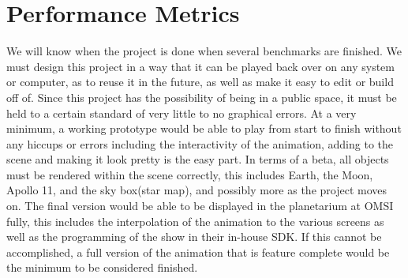 \documentclass[10pt,a4paper,oneside,onecolumn, english]{IEEEtran}
\begin{document}
\section{Performance Metrics}
We will know when the project is done when several benchmarks are finished. We must design this project in a way that it can be played back over on any system or computer, as to reuse it in the future, as well as make it easy to edit or build off of. Since this project has the possibility of being in a public space, it must be held to a certain standard of very little to no graphical errors. At a very minimum, a working prototype would be able to play from start to finish without any hiccups or errors including the interactivity of the animation, adding to the scene and making it look pretty is the easy part. In terms of a beta, all objects must be rendered within the scene correctly, this includes Earth, the Moon, Apollo 11, and the sky box(star map), and possibly more as the project moves on. The final version would be able to be displayed in the planetarium at OMSI fully, this includes the interpolation of the animation to the various screens as well as the programming of the show in their in-house SDK. If this cannot be accomplished, a full version of the animation that is feature complete would be the minimum to be considered finished.  
\end{document}
